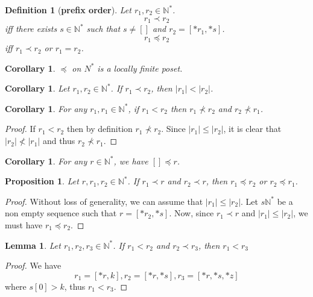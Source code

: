 \documentclass[10pt]{article}
\theoremstyle{plain}
\newtheorem{proposition}[theorem]{Proposition}
\newtheorem{definition}[theorem]{Definition}
\newtheorem{corollary}[theorem]{Corollary}
\newtheorem{lemma}[theorem]{Lemma}
\newcommand{\N}{\mathbb{N}}
\begin{document}
\begin{definition}[\textbf{prefix order}]
\label{prefix-order}
Let $r_1, r_2\in \N^*$.
\begin{equation}
r_1 \prec r_2
\end{equation}
iff there exists $s\in\N^*$ such that $s\not=[]$ and $r_2 = [*r_1, *s]$.
\begin{equation}
r_1 \preceq r_2
\end{equation}
iff $r_1 \prec r_2$ or $r_1 = r_2$.
\end{definition}

\begin{corollary}
$\preceq$ on $N^*$ is a locally finite poset.
\end{corollary}

\begin{corollary}
Let $r_1, r_2\in \N^*$.
If $r_1 \prec r_2$, then $|r_1| < |r_2|$.
\end{corollary}

\begin{corollary}
\label{proceed-no-prefix}
For any $r_1, r_1\in\N^*$, if $r_1 < r_2$ then
$r_1\not\prec r_2$ and $r_2 \not\prec r_1$.
\end{corollary}
\begin{proof}
If $r_1 < r_2$ then by definition $r_1 \not\prec r_2$. Since $|r_1| \leq |r_2|$, it is clear that
$|r_2| \not< |r_1|$ and thus $r_2\not\prec r_1$.
\end{proof}   



\begin{corollary}
For any $r\in \N^*$, we have $[] \preceq r$.
\end{corollary}

\begin{proposition}
\label{common_prefix}
Let $r, r_1, r_2\in\N^*$. 
If $r_1 \prec r$ and $r_2 \prec r$, 
then $r_1 \preceq r_2$ or $r_2 \preceq r_1$. 
\end{proposition}
\begin{proof}
Without loss of generality, we can assume that $|r_1|\leq |r_2|$.
Let $s\N^*$ be a non empty sequence such that $r = [*r_2, *s]$. 
Now, since $r_1 \prec r$ and $|r_1|\leq |r_2|$, we must have $r_1 \preceq r_2$.    
\end{proof}

\begin{lemma}
\label{ord-prec-trans}
Let $r_1, r_2, r_3\in \N^*$.
If $r_1 < r_2$ and $r_2 \prec r_3$, then $r_1 < r_3$
\end{lemma}
\begin{proof}
We have
$$
r_1 = [*r, k], r_2 = [*r, *s], r_3 = [*r, *s, *z]
$$
where $s[0] > k$, thus $r_1 < r_3$.
\end{proof}
\end{document}

